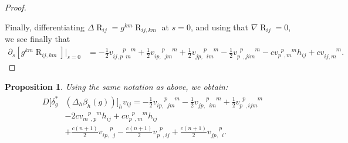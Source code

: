 \documentclass[10pt,reqno]{amsart}
\newtheorem{prop}[theorem]{Proposition}
\DeclareMathOperator{\Rc}{R}
\newcommand{\vdddu}[4]{v_{#1 #2, #3}^{\phantom{#1#2,#3} #4}}
\newcommand{\vddud}[4]{v_{#1 #2, \phantom{#3} #4}^{\phantom{#1#2,} #3 \phantom{#4}}}
\newcommand{\vdudd}[4]{v_{#1 \phantom{#2}, #3 #4}^{\phantom{#1} #2 \phantom{, #3 #4}}}
\newcommand{\vdudu}[4]{v_{#1 \phantom{#2}, #3 \phantom{#4}}^{\phantom{#1} #2 \phantom{, #3} #4}}
\newcommand{\vdddudu}[6]{v_{#1#2,#3\phantom{#4}#5\phantom{#6}}^{\phantom{#1#2,#3}#4\phantom{#5}#6}}
\newcommand{\vdduddu}[6]{v_{#1#2,\phantom{#3}#4#5\phantom{#6}}^{\phantom{#1#2,}#3\phantom{#4#5}#6}}
\newcommand{\vdudddu}[6]{v_{#1\phantom{#2},#3#4#5\phantom{#6}}^{\phantom{#1}#2\phantom{,#3#4#5}#6}}
\begin{document}
\begin{proof}
\

Finally, differentiating $\Delta \Rc_{ij} = g^{km} \Rc_{ij,km}$ at $s=0$, and using that $\nabla \Rc_{ij} = 0$,  we see finally that
\begin{align*}
\partial_s [g^{km} \Rc_{ij,km}] |_{s=0}
&= -\frac{1}{2} \vdddudu{i}{j}{p}{p}{m}{m}  + \frac{1}{2} \vdduddu{i}{p}{p}{j}{m}{m} + \frac{1}{2} \vdduddu{j}{p}{p}{i}{m}{m} - \frac{1}{2} \vdudddu{p}{p}{j}{i}{m}{m}  - c \vdudu{p}{p}{m}{m}  h_{ij} + c \vdddu{i}{j}{m}{m}.
\end{align*}
\end{proof}

\begin{prop}
\label{prop:lin-high-order}
Using the same notation as above, we obtain:
\begin{align} \label{eqn:lin-gauge}
\begin{aligned}
D[ \delta_{g}^* & ( \Delta_h \beta_h (g)  ) ]_h v_{ij} = -\frac{1}{2} \vdduddu{i}{p}{p}{j}{m}{m} -\frac{1}{2} \vdduddu{j}{p}{p}{i}{m}{m} + 
\frac{1}{2} \vdudddu{p}{p}{i}{j}{m}{m} \\ & - 2c  \vdudu{m}{p}{p}{m} h_{ij} + c \vdudu{p}{p}{m}{m}  h_{ij} \\
& + \frac{c(n+1)}{2} \vddud{i}{p}{p}{j} - \frac{c(n+1)}{2}  \vdudd{p}{p}{i}{j}  + \frac{c(n+1)}{2} \vddud{j}{p}{p}{i} . 
\end{aligned}
\end{align}
\end{prop}
\end{document}
